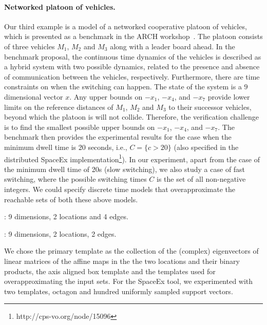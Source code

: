 \paragraph{Networked platoon of vehicles.}
Our third example is a model of a networked cooperative platoon of
vehicles, which is presented as a benchmark in the ARCH
workshop~\cite{makhlouf2014networked}.  The platoon consists of three
vehicles $M_1$, $M_2$ and $M_3$ along with a leader board ahead. %
In the benchmark proposal, the continuous time dynamics of the
vehicles is described as a hybrid system with two possible dynamics,
related to the presence and absence of communication between the
vehicles, respectively.  Furthermore, there are time constraints on
when the switching can happen.  The state of the system is a $9$
dimensional vector $x$. %
Any upper bounds on
$-x_1$, $-x_4$, and $-x_7$ provide lower limits on the reference
distances of $M_1$, $M_2$ and $M_3$ to their successor vehicles,
beyond which the platoon is will not collide.  Therefore, the
verification challenge is to find the smallest possible upper bounds
on $-x_1$, $-x_4$, and $-x_7$.  The benchmark then provides the
experimental results for the case when the minimum dwell time is 20
seconds, i.e., $C=\{c>20\}$ (also specified in the distributed SpaceEx
implementation\footnote{http://cps-vo.org/node/15096}).  In our
experiment, apart from the case of the minimum dwell time of 20s (slow
switching), we also study a case of fast switching, where the possible
switching times $C$ is the set of all non-negative integers.  We could
specify discrete time models that overapproximate the reachable sets
of both these above models. %

: 9 dimensions, 2
locations and 4 edges.

: 9 dimensions, 2
locations, 2 edges.

  We chose the primary template
as the collection of the (complex) eigenvectors of linear matrices of
the affine maps in the the two locations and their binary products,
the axis aligned box template and the templates used for
overapproximating the input sets. For the SpaceEx tool, we
experimented with two templates, octagon and hundred uniformly sampled
support vectors.

